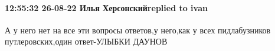  
 
 
 
 

\paragraph{12:55:32 26-08-22 Илья Херсонскийreplied to ivan}

А у него нет на все эти вопросы ответов,у него,как у всех пидлабузников
путлеровских,один ответ-УЛЫБКИ ДАУНОВ


